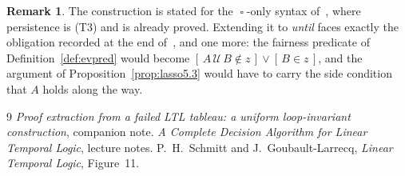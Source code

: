 \documentclass[11pt,a4paper]{article}
\theoremstyle{definition}
\newtheorem{remark}[theorem]{Remark}
\newcommand{\Always}{\mathop{\square}}
\begin{document}
\begin{remark}
The construction is stated for the $\Always$-only syntax of~\cite{m4}, where
persistence is (T3) and is already proved.  Extending it to \emph{until} faces
exactly the obligation recorded at the end of~\cite{m4}, and one more: the
fairness predicate of Definition~\ref{def:evpred} would become
$[\,A\,\mathcal{U}\,B\notin z\,]\vee[\,B\in z\,]$, and the argument of
Proposition~\ref{prop:lasso5.3} would have to carry the side condition that $A$
holds along the way.
\end{remark}

\begin{thebibliography}{9}
 \emph{Proof extraction from a failed LTL tableau: a uniform
loop-invariant construction}, companion note.
 \emph{A Complete Decision Algorithm for Linear Temporal Logic},
lecture notes.
 P.~H.~Schmitt and J.~Goubault-Larrecq, \emph{Linear Temporal
Logic}, Figure~11.
\end{thebibliography}
\end{document}
